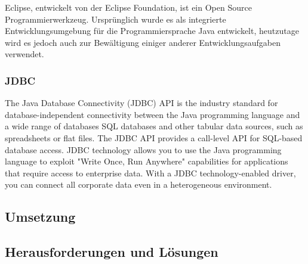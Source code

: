 Eclipse, entwickelt von der Eclipse Foundation, ist ein Open Source Programmierwerkzeug. Ursprünglich wurde es als integrierte Entwicklungsumgebung für die Programmiersprache Java entwickelt, heutzutage wird es jedoch auch zur Bewältigung einiger anderer Entwicklungsaufgaben verwendet.

    \subsubsection{JDBC}
    
The Java Database Connectivity (JDBC) API is the industry standard for database-independent connectivity between the Java programming language and a wide range of databases  SQL databases and other tabular data sources, such as spreadsheets or flat files. The JDBC API provides a call-level API for SQL-based database access.
JDBC technology allows you to use the Java programming language to exploit "Write Once, Run Anywhere" capabilities for applications that require access to enterprise data. With a JDBC technology-enabled driver, you can connect all corporate data even in a heterogeneous environment.


  \subsection{Umsetzung}

  \subsection{Herausforderungen und Lösungen}
